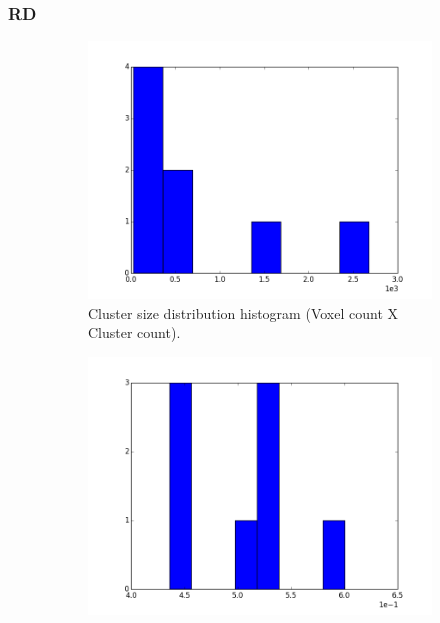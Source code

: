 \documentclass[a4paper,11pt]{report}
\begin{document}
    \subsubsection{RD}
    \begin{figure}[!ht]
      \centering

      \begin{subfigure}[t]{.49\textwidth}
        \includegraphics[width=1\linewidth]{img/histograms/rd_clustered_fa_mask_region_sizes_hist.png}
        \caption{Cluster size distribution histogram (Voxel count X Cluster count).}
        \label{subfig:fa_hist_region}
      \end{subfigure}\hfill%
      \begin{subfigure}[t]{.49\textwidth}
        \includegraphics[width=1\linewidth]{img/histograms/rd_clustered_fa_mask_fa_means_hist.png}

\end{subfigure}
\end{figure}
\end{document}
